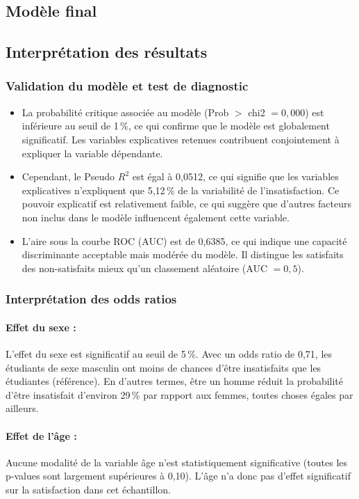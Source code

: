 \documentclass[
12pt,          %
a4paper,       %
oneside,      %
openright      %
]{report}          %
\begin{document}
		\subsection{Modèle final}
		
		
		
		\subsection{Interprétation des résultats}
		\subsubsection{Validation du modèle et test de diagnostic}
		\begin{itemize}
			\item La probabilité critique associée au modèle (Prob $>$ chi2 $= 0{,}000$) est inférieure au seuil de 1\,\%, ce qui confirme que le modèle est globalement significatif. Les variables explicatives retenues contribuent conjointement à expliquer la variable dépendante.
			\item Cependant, le Pseudo $R^2$ est égal à 0,0512, ce qui signifie que les variables explicatives n'expliquent que 5,12\,\% de la variabilité de l'insatisfaction. Ce pouvoir explicatif est relativement faible, ce qui suggère que d'autres facteurs non inclus dans le modèle influencent également cette variable.
			\item L'aire sous la courbe ROC (AUC) est de 0,6385, ce qui indique une capacité discriminante acceptable mais modérée du modèle. Il distingue les satisfaits des non-satisfaits mieux qu'un classement aléatoire (AUC $= 0{,}5$).
		\end{itemize}
		
		\subsubsection{Interprétation des odds ratios}
		\paragraph{Effet du sexe :}
		L'effet du sexe est significatif au seuil de 5\,\%. Avec un odds ratio de 0,71, les étudiants de sexe masculin ont moins de chances d'être insatisfaits que les étudiantes (référence). En d'autres termes, être un homme réduit la probabilité d'être insatisfait d'environ 29\,\% par rapport aux femmes, toutes choses égales par ailleurs.
		\paragraph{Effet de l'âge :}
		Aucune modalité de la variable âge n'est statistiquement significative (toutes les p-values sont largement supérieures à 0,10). L'âge n'a donc pas d'effet significatif sur la satisfaction dans cet échantillon.
\end{document}
